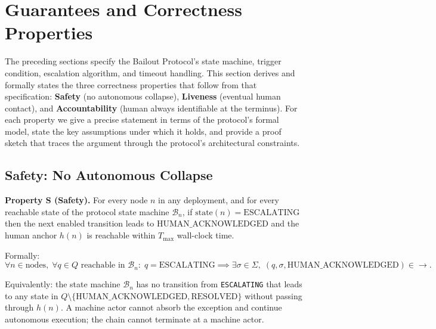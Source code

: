 \section{Guarantees and Correctness Properties}\label{sec:properties}

The preceding sections specify the Bailout Protocol's state machine, trigger condition, escalation algorithm, and timeout handling. This section derives and formally states the three correctness properties that follow from that specification: \textbf{Safety} (no autonomous collapse), \textbf{Liveness} (eventual human contact), and \textbf{Accountability} (human always identifiable at the terminus). For each property we give a precise statement in terms of the protocol's formal model, state the key assumptions under which it holds, and provide a proof sketch that traces the argument through the protocol's architectural constraints.

\subsection{Safety: No Autonomous Collapse}\label{sec:safety}

\textbf{Property S (Safety).} For every node $n$ in any \bxthree{} deployment, and for every reachable state of the protocol state machine $\mathcal{B}_n$, if $\text{state}(n) = \text{ESCALATING}$ then the next enabled transition leads to $\text{HUMAN\_ACKNOWLEDGED}$ and the human anchor $h(n)$ is reachable within $T_{\max}$ wall-clock time.

Formally:
\[
\forall n \in \text{nodes},\; \forall q \in Q \text{ reachable in } \mathcal{B}_n:\;
q = \text{ESCALATING} \implies \exists \sigma \in \Sigma,\;
(q, \sigma, \text{HUMAN\_ACKNOWLEDGED}) \in \rightarrow.
\tag{S}
\]

Equivalently: the state machine $\mathcal{B}_n$ has no transition from \texttt{ESCALATING} that leads to any state in $Q \setminus \{\text{HUMAN\_ACKNOWLEDGED}, \text{RESOLVED}\}$ without passing through $h(n)$. A machine actor cannot absorb the exception and continue autonomous execution; the chain cannot terminate at a machine actor.

